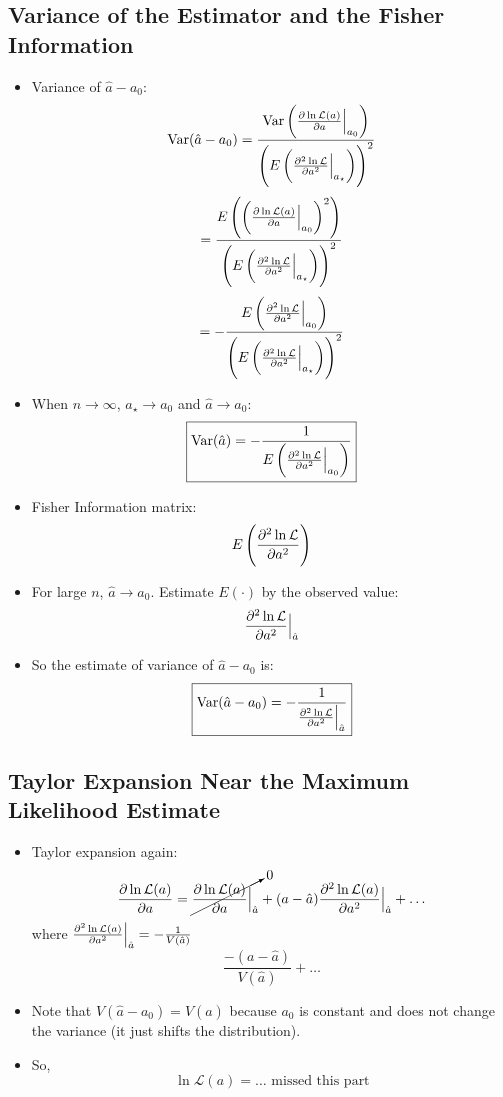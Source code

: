 \subsection{Variance of the Estimator and the Fisher Information}

\begin{itemize}
      \item Variance of $\hat{a} - a_0$:
            \[ \text{Var}(\hat{a} - a_0) = \frac{\text{Var}\left( \pdv{\ln \mathcal{L}(a)}{a} \Big|_{a_0} \right)}{\left( E\left( \pdv[2]{\ln \mathcal{L}}{a} \Big|_{a_{\star}} \right) \right)^2} \]
            \[ = \frac{E\left( \left( \pdv{\ln \mathcal{L}(a)}{a} \Big|_{a_0} \right)^2 \right)}{\left( E\left( \pdv[2]{\ln \mathcal{L}}{a} \Big|_{a_{\star}} \right) \right)^2} \]
            \[ = -\frac{E\left( \pdv[2]{\ln \mathcal{L}}{a} \Big|_{a_0} \right)}{\left( E\left( \pdv[2]{\ln \mathcal{L}}{a} \Big|_{a_{\star}} \right) \right)^2} \]
      \item When $n \to \infty$, $a_{\star} \to a_0$ and $\hat{a} \to a_0$:
            \[ \boxed{\text{Var}(\hat{a}) = -\frac{1}{E\left( \pdv[2]{\ln \mathcal{L}}{a} \Big|_{a_0} \right)} } \]
      \item Fisher Information matrix:
            \[ E\left( \pdv[2]{\ln \mathcal{L}}{a} \right) \]
      \item For large $n$, $\hat{a} \to a_0$. Estimate $E(\cdot)$ by the observed value:
            \[ \pdv[2]{\ln \mathcal{L}}{a} \Big|_{\hat{a}} \]
      \item So the estimate of variance of $\hat{a} - a_0$ is:
            \[ \boxed{\text{Var}(\hat{a}-a_0) = -\frac{1}{\pdv[2]{\ln \mathcal{L}}{a} \Big|_{\hat{a}}} } \]
\end{itemize}

\subsection{Taylor Expansion Near the Maximum Likelihood Estimate}

\begin{itemize}
      \item Taylor expansion again:
            \[ \pdv{\ln \mathcal{L}(a)}{a} = \cancelto{0}{\pdv{\ln \mathcal{L}(a)}{a} \Big|_{\hat{a}}} + (a - \hat{a}) \pdv[2]{\ln \mathcal{L}(a)}{a} \Big|_{\hat{a}} + \ldots \]
            where $\pdv[2]{\ln \mathcal{L}(a)}{a} \Big|_{\hat{a}} = -\frac{1}{V(\hat{a})}$
            \[ \frac{-(a-\hat{a})}{V(\hat{a})} + \ldots \]
      \item Note that $V(\hat{a} - a_0) = V(\hat{a})$ because $a_0$ is constant and does not change the variance (it just shifts the distribution).
      \item So,
            \[ \ln \mathcal{L}(a) = \ldots \text{ missed this part} \]
\end{itemize}

